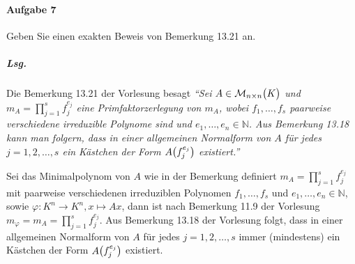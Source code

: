 \documentclass{scrreprt}
\begin{document}
\newpage
\paragraph{Aufgabe 7} Geben Sie einen exakten Beweis von Bemerkung 13.21 an.

\subparagraph{Lsg.} Die Bemerkung 13.21 der Vorlesung besagt \emph{``Sei
  $A \in \mathcal{M}_{n \times n}\qty\big(K)$ und
  $m_A = \prod_{j = 1}^s f_j^{e_j}$ eine Primfaktorzerlegung von $m_A$, wobei
  $f_1, \ldots, f_s$ paarweise verschiedene irreduzible Polynome sind und
  $e_1, \ldots, e_n \in \mathbb{N}$.
  Aus Bemerkung 13.18 kann man folgern, dass in einer allgemeinen Normalform von
  $A$ für jedes $j = 1, 2, \ldots, s$ ein Kästchen der Form
  $A\qty\big(f_j^{e_j})$ existiert.''}

Sei das Minimalpolynom von $A$ wie in der Bemerkung definiert
$m_A = \prod_{j = 1}^s f_j^{e_j}$ mit paarweise verschiedenen irreduziblen
Polynomen $f_1, \ldots, f_s$ und $e_1, \ldots, e_n \in \mathbb{N}$, sowie
$\varphi \colon K^n \to K^n, x \mapsto Ax$, dann ist nach Bemerkung 11.9 der
Vorlesung $m_{\varphi} = m_A = \prod_{j = 1}^s f_j^{e_j}$.
Aus Bemerkung 13.18 der Vorlesung folgt, dass in einer allgemeinen Normalform von
$A$ für jedes $j = 1, 2, \ldots, s$ immer (mindestens) ein Kästchen der Form
$A\qty\big(f_j^{e_j})$ existiert.
\end{document}
